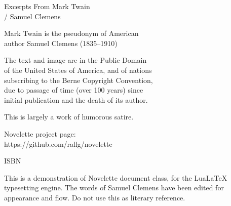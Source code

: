 \documentclass[../../demo.tex]{novelette-subdoc}
\begin{document}

\begin{pageiii} %
\null\null\null\null\null %
\null\null\null %
\vfill %
\end{pageiii}

\begin{pageiv} %
Excerpts From Mark Twain\\/ Samuel Clemens\par
Mark Twain is the pseudonym of American\\
author Samuel Clemens (1835--1910)\par
The text and image are in the Public Domain\\
of the United States of America, and of nations\\
subscribing to the Berne Copyright Convention,\\
due to passage of time (over 100 years) since\\
initial publication and the death of its author.\par
This is largely a work of humorous satire.\par
Novelette project page:\\https://github.com/rallg/novelette\par
ISBN \par
\end{pageiv}

\begin{pagev} %
\null\null\null\null\null %
\null\null\null\null\null %
\begin{blockindent}[4,4] %
\noindent This is a demonstration of Novelette document
class, for the LuaLaTeX typesetting engine.
The words of Samuel Clemens have been edited for appearance and flow.
Do not use this as literary reference.\par
\end{blockindent}
\end{pagev}

\end{document}
